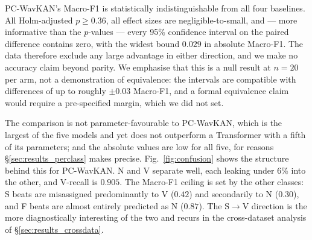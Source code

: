 \documentclass[journal,twoside,web]{ieeecolor}
\begin{document}
\begin{table}[!t]
\centering
\caption{\textbf{Primary outcome.} DS2 Macro-F1, PC-WavKAN vs.\ four baselines, 20 paired seeds. $\Delta$, CI and $d$ are PC-WavKAN minus baseline; $p$ is Holm-adjusted across the four comparisons. No comparison reaches significance and every CI includes zero.}
\label{tab:baseline_comparison}
\end{table}

PC-WavKAN's Macro-F1 is statistically indistinguishable from all four baselines. All Holm-adjusted $p \geq 0.36$, all effect sizes are negligible-to-small, and --- more informative than the $p$-values --- every 95\% confidence interval on the paired difference contains zero, with the widest bound $0.029$ in absolute Macro-F1. The data therefore exclude any large advantage in either direction, and we make no accuracy claim beyond parity. We emphasise that this is a null result at $n=20$ per arm, not a demonstration of equivalence: the intervals are compatible with differences of up to roughly $\pm0.03$ Macro-F1, and a formal equivalence claim would require a pre-specified margin, which we did not set.

The comparison is not parameter-favourable to PC-WavKAN, which is the largest of the five models and yet does not outperform a Transformer with a fifth of its parameters; and the absolute values are low for all five, for reasons \S\ref{sec:results_perclass} makes precise. Fig.~\ref{fig:confusion} shows the structure behind this for PC-WavKAN. N and V separate well, each leaking under 6\% into the other, and V-recall is $0.905$. The Macro-F1 ceiling is set by the other classes: S beats are misassigned predominantly to V ($0.42$) and secondarily to N ($0.30$), and F beats are almost entirely predicted as N ($0.87$). The S$\rightarrow$V direction is the more diagnostically interesting of the two and recurs in the cross-dataset analysis of \S\ref{sec:results_crossdata}.
\end{document}
